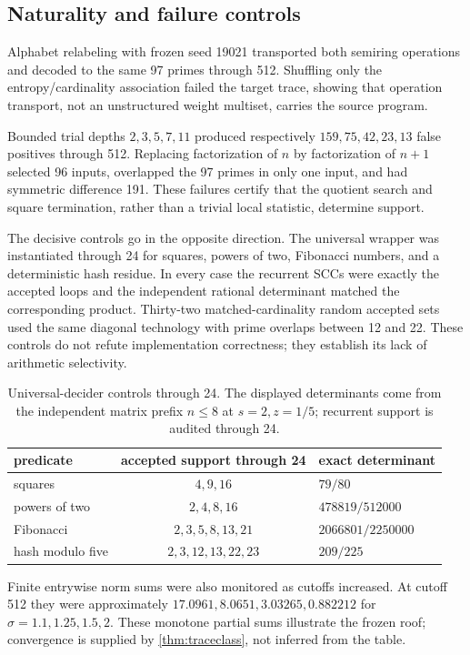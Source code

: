 \subsection{Naturality and failure controls}

Alphabet relabeling with frozen seed 19021 transported both semiring
operations and decoded to the same 97 primes through 512.  Shuffling only
the entropy/cardinality association failed the target trace, showing that
operation transport, not an unstructured weight multiset, carries the source
program.

Bounded trial depths $2,3,5,7,11$ produced respectively
$159,75,42,23,13$ false positives through 512.  Replacing factorization of
$n$ by factorization of $n+1$ selected 96 inputs, overlapped the 97 primes in
only one input, and had symmetric difference 191.  These failures certify
that the quotient search and square termination, rather than a trivial local
statistic, determine support.

The decisive controls go in the opposite direction.  The universal wrapper
was instantiated through 24 for squares, powers of two, Fibonacci numbers,
and a deterministic hash residue.  In every case the recurrent SCCs were
exactly the accepted loops and the independent rational determinant matched
the corresponding product.  Thirty-two matched-cardinality random accepted
sets used the same diagonal technology with prime overlaps between 12 and
22.  These controls do not refute implementation correctness; they establish
its lack of arithmetic selectivity.

\begin{table}[t]
\centering
\small
\caption{Universal-decider controls through 24.  The displayed determinants
come from the independent matrix prefix $n\le8$ at $s=2,z=1/5$; recurrent
support is audited through 24.}
\label{tab:universal-controls}
\begin{tabular}{lcl}
\toprule
predicate & accepted support through 24 & exact determinant \\
\midrule
squares & $4,9,16$ & $79/80$ \\
powers of two & $2,4,8,16$ & $478819/512000$ \\
Fibonacci & $2,3,5,8,13,21$ & $2066801/2250000$ \\
hash modulo five & $2,3,12,13,22,23$ & $209/225$ \\
\bottomrule
\end{tabular}
\end{table}

Finite entrywise norm sums were also monitored as cutoffs increased.  At
cutoff 512 they were approximately $17.0961,8.0651,3.03265,0.882212$ for
$\sigma=1.1,1.25,1.5,2$.  These monotone partial sums illustrate the frozen
roof; convergence is supplied by \cref{thm:traceclass}, not inferred from
the table.

